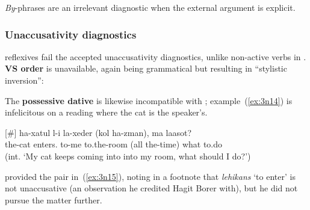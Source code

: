 \begin{exe}
\begin{xlist}
\begin{xlist}
\begin{exe}
\begin{xlist}
\begin{xlist}
\begin{exe}
\begin{xlist}
\begin{xlist}
\begin{exe}
\begin{exe}
\begin{xlist}
\begin{exe}
\begin{exe}
\begin{xlist}
\begin{exe}
\begin{exe}
\emph{By}-phrases are an irrelevant diagnostic when the external argument is explicit.

		\subsubsection{Unaccusativity diagnostics} \label{vz:tnif:figrefl:unacc}
 reflexives fail the accepted unaccusativity diagnostics, unlike non-active verbs in {\tnif}. \textbf{VS order} is unavailable, again being grammatical but resulting in ``stylistic inversion'':
 \begin{exe}
	
 \z 

The \textbf{possessive dative} is likewise incompatible with ; example~(\ref{ex:3n14}) is infelicitous on a reading where the cat is the speaker's.
 \begin{exe}
\ex   \label{ex:3n14}
[\#] 	{ \gll ha-xatul  l-i la-xeder (kol ha-zman), ma laasot?\\
 	  the-cat enters. to-me to.the-room (all the-time) what to.do\\
 	\glt (int. `My cat keeps coming into into my room, what should I do?') } 
	
 \z 

\citet[134]{shlonsky87} provided the pair in~(\ref{ex:3n15}), noting in a footnote that \emph{lehikans} `to enter' is not unaccusative (an observation he credited Hagit Borer with), but he did not pursue the matter further.
 \begin{exe}
 \ex  \label{ex:3n15}
 \begin{xlist} 
		
		

\end{xlist}
\end{exe}
\end{exe}
\end{exe}
\end{exe}
\end{exe}
\end{xlist}
\end{exe}
\end{exe}
\end{xlist}
\end{exe}
\end{exe}
\end{xlist}
\end{xlist}
\end{exe}
\end{xlist}
\end{xlist}
\end{exe}
\end{xlist}
\end{xlist}
\end{exe}
